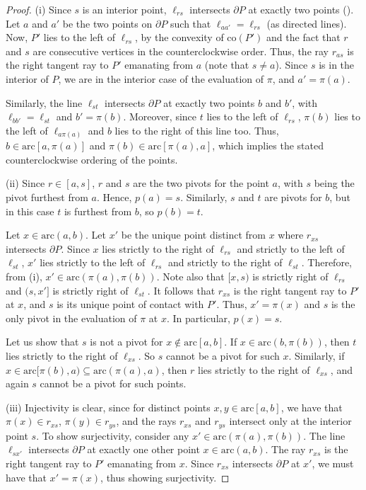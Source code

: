 \documentclass[11pt]{amsart}
\theoremstyle{remark}
\numberwithin{equation}{section}
\newcommand{\co}{\mathrm{co}}
\newcommand{\arc}{\mathrm{arc}}
\begin{document}
\begin{proof}
(i) Since $s$ is an interior point, $\ell_{rs}$ intersects $\partial P$ at exactly two points (\cite[Corollary 8.16]{lee}). Let $a$ and $a'$ be the two points on  $\partial P$ such that $\ell_{aa'}=\ell_{rs}$ (as directed lines). Now, $P'$ lies to the left of $\ell_{rs}$, by the convexity of $\co(P')$ and the fact that  $r$ and $s$ are consecutive vertices in the counterclockwise order. Thus, the ray $r_{as}$ is the right tangent ray to $P'$ emanating from $a$
(note that $s\neq a$).  Since  $s$ is in the interior of $P$, we are in the interior case of the evaluation of $\pi$, and  $a'=\pi(a)$. 

Similarly, the line $\ell_{st}$ intersects $\partial P$ at exactly two points $b$ and $b'$, with $\ell_{bb'}=\ell_{st}$ and $b'=\pi(b)$. Moreover, since $t$
lies to the left of $\ell_{rs}$, $\pi(b)$ lies to the left of $\ell_{a\pi(a)}$ and $b$ lies to the right of this line too. Thus, $b\in \arc[a,\pi(a)]$
and $\pi(b)\in \arc[\pi(a),a]$, which implies the stated counterclockwise ordering of the points.





(ii) Since $r\in [a,s]$, $r$ and $s$ are the two pivots for the point $a$, with $s$ being the pivot furthest from $a$. Hence, $p(a)=s$. Similarly, $s$ and $t$ are pivots for $b$, but in this case $t$ is furthest from $b$, so $p(b)=t$.


Let $x\in \arc(a,b)$. Let $x'$ be the unique point distinct from $x$ where $r_{xs}$ intersects $\partial P$. Since $x$ lies strictly to the right of $\ell_{rs}$ and strictly to the left of $\ell_{st}$,  $x'$ lies strictly to the left of $\ell_{rs}$ and strictly to the right of $\ell_{st}$. Therefore, from (i), $x'\in \arc(\pi(a),\pi(b))$. Note also that $[x,s)$
is strictly right of $\ell_{rs}$ and $(s,x']$ is strictly right of $\ell_{st}$. It follows that $r_{xs}$ is the right tangent ray to $P'$ at $x$, and $s$ is its unique point of contact with $P'$. Thus, $x'=\pi(x)$ and $s$ is the only pivot in the evaluation of $\pi$ at $x$. In particular, $p(x)=s$.



Let us show that $s$ is not a pivot for $x\notin \arc[a,b]$. If $x\in \arc(b,\pi(b))$, then $t$ lies strictly to the right of $\ell_{xs}$. So $s$ cannot be a pivot for such $x$. Similarly, if $x\in \arc[\pi(b),a)\subseteq \arc(\pi(a),a)$, then $r$ lies strictly to the right of $\ell_{xs}$, and again $s$ cannot be a pivot for such points.


(iii) Injectivity is clear, since for distinct points $x,y\in \arc[a,b]$, we have that $\pi(x)\in r_{xs}$, $\pi(y)\in r_{ys}$, and the rays $r_{xs}$ and $r_{ys}$ intersect only at the interior point $s$. To show surjectivity, consider any $x'\in \arc(\pi(a),\pi(b))$. The line $\ell_{sx'}$ intersects $\partial P$ at exactly one other point $x\in \arc(a,b)$. The ray $r_{xs}$ is the right tangent ray to $P'$ emanating from $x$. Since $r_{xs}$ intersects $\partial P$ at $x'$, we must have that $x'=\pi(x)$, thus showing surjectivity.
\end{proof}
\end{document}

